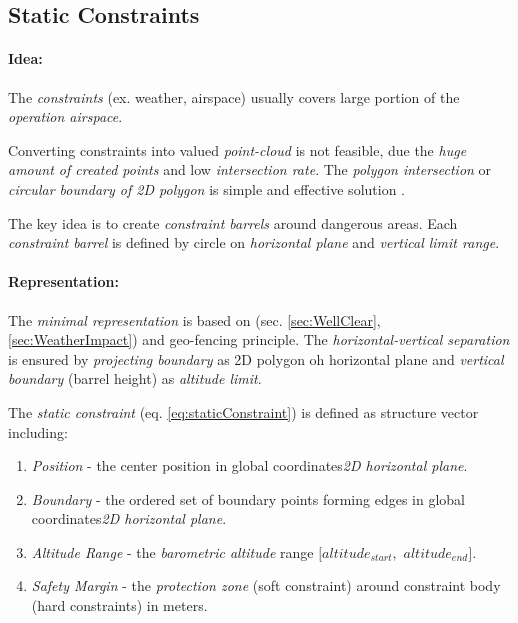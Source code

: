 \subsection{Static Constraints}\label{s:virtualConstraints}
\paragraph{Idea:} The \emph{constraints} (ex. weather, airspace) usually covers large portion of the \emph{operation airspace}. 

Converting constraints into valued \emph{point-cloud} is not feasible, due the \emph{huge amount of created points} and low \emph{intersection rate}. The \emph{polygon intersection} or \emph{circular boundary of 2D polygon} is simple and effective solution \cite{ritter1990efficient,welzl1991smallest}. 

The key idea is to create \emph{constraint barrels} around dangerous areas. Each \emph{constraint barrel} is defined by circle on \emph{horizontal plane} and \emph{vertical limit range}.

\paragraph{Representation:} The \emph{minimal representation} is based on (sec. \ref{sec:WellClear}, \ref{sec:WeatherImpact}) and geo-fencing principle. The \emph{horizontal-vertical separation} is ensured by \emph{projecting boundary} as 2D polygon oh horizontal plane and \emph{vertical boundary} (barrel height) as \emph{altitude limit}. 

The \emph{static constraint} (eq. \ref{eq:staticConstraint}) is defined as structure vector including:
\begin{enumerate}
    \item \emph{Position} - the center position in global coordinates\emph{2D horizontal plane}.
    
    \item \emph{Boundary} - the ordered set of boundary points forming edges in global coordinates\emph{2D horizontal plane}.
    
    \item \emph{Altitude Range} - the \emph{barometric altitude} range $[altitude_{start},$ $altitude_{end}]$.
    
    \item \emph{Safety Margin} - the \emph{protection zone} (soft constraint) around constraint body (hard constraints) in meters.
\end{enumerate}

